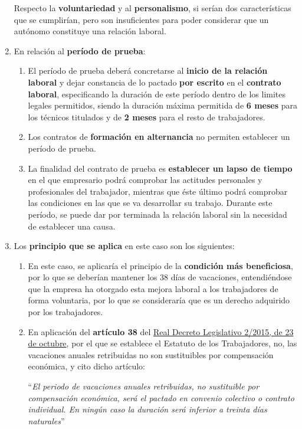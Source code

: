 \begin{enumerate}[label=(\alph*)]
     Respecto la \textbf{voluntariedad} y al \textbf{personalismo}, si serían dos características que se cumplirían, pero son insuficientes para poder considerar que un autónomo constituye una relación laboral.

    \item En relación al \textbf{período de prueba}:
    \begin{enumerate}[label=\arabic*.]
        \item El período de prueba deberá concretarse al \textbf{inicio de la relación laboral} y dejar constancia de lo pactado \textbf{por escrito} en el \textbf{contrato laboral}, especificando la duración de este período dentro de los limites legales permitidos, siendo la duración máxima permitida de \textbf{6 meses} para los técnicos titulados y de \textbf{2 meses} para el resto de trabajadores.

        \item Los contratos de \textbf{formación en alternancia} no permiten establecer un período de prueba.

        \item La finalidad del contrato de prueba es\textbf{ establecer un lapso de tiempo} en el que empresario podrá comprobar las actitudes personales y profesionales del trabajador, mientras que éste último podrá comprobar las condiciones en las que se va desarrollar su trabajo. Durante este período, se puede dar por terminada la relación laboral sin la necesidad de establecer una causa.
    \end{enumerate}
    \item Los \textbf{principio que se aplica} en este caso son los siguientes:
    \begin{enumerate}[label=\arabic*.]
        \item  En este caso, se aplicaría el principio de la \textbf{condición más beneficiosa}, por lo que se deberían mantener los 38 días de vacaciones, entendiéndose que la empresa ha otorgado esta mejora laboral a los trabajadores de forma voluntaria, por lo que se consideraría que es un derecho adquirido por los trabajadores.

        \item  En aplicación del \textbf{artículo 38} del \href{https://www.boe.es/buscar/act.php?id=BOE-A-2015-11430}{Real Decreto Legislativo 2/2015, de 23 de octubre}, por el que se establece el Estatuto de los Trabajadores, no, las vacaciones anuales retribuidas no son sustituibles por compensación económica, y cito dicho artículo:

        ``\textit{El periodo de vacaciones anuales retribuidas, no sustituible por compensación económica, será el pactado en convenio colectivo o contrato individual. En ningún caso la duración será inferior a treinta días naturales}'' \cite{rd2015}
    \end{enumerate}

\end{enumerate}

